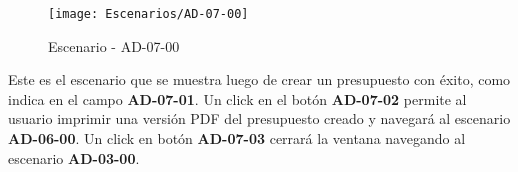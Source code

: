 \begin{figure}[H]
\centering
\texttt{[image: Escenarios/AD-07-00]}
\caption{Escenario - AD-07-00}
\label{fig:AD-07-00}
\end{figure}
Este es el escenario que se muestra luego de crear un presupuesto con éxito, como indica en el campo \textbf{AD-07-01}. Un click en el botón \textbf{AD-07-02} permite al usuario imprimir una versión PDF del presupuesto creado y navegará al escenario \textbf{AD-06-00}. Un click en botón \textbf{AD-07-03} cerrará la ventana navegando al escenario \textbf{AD-03-00}.
\clearpage
